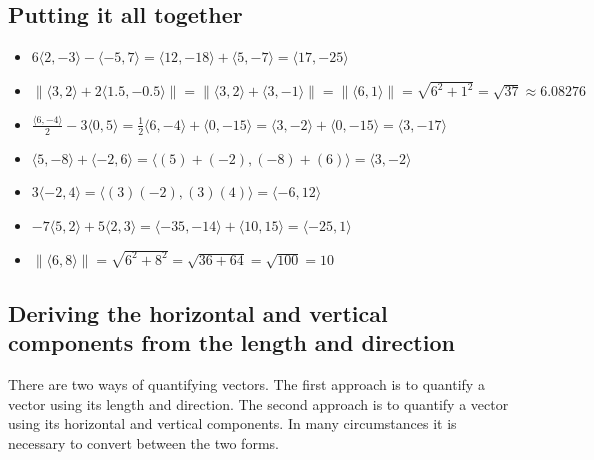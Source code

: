 \documentclass{article}
\begin{document}
\subsection*{Putting it all together}

\begin{itemize}
\item \(6\langle 2, -3 \rangle - \langle -5, 7 \rangle = \langle 12, -18 \rangle + \langle 5, -7 \rangle = \langle 17, -25 \rangle\)
\item \(\|\langle 3, 2 \rangle + 2\langle 1.5, -0.5 \rangle\| = \|\langle 3, 2 \rangle + \langle 3, -1 \rangle\| = \|\langle 6, 1 \rangle\| = \sqrt{6^2 + 1^2} = \sqrt{37} \approx 6.08276\)
\item \(\frac{\langle 6, -4 \rangle}{2} - 3\langle 0, 5 \rangle = \frac{1}{2}\langle 6, -4 \rangle + \langle 0, -15 \rangle = \langle 3, -2 \rangle + \langle 0, -15 \rangle = \langle 3, -17 \rangle\)
\item \(\langle 5, -8 \rangle + \langle -2, 6 \rangle = \langle (5) + (-2) , (-8) + (6) \rangle = \langle 3 , -2 \rangle\)
\item \(3 \langle -2, 4 \rangle = \langle (3)(-2), (3)(4) \rangle = \langle -6, 12 \rangle\)
\item \(-7 \langle 5, 2 \rangle + 5 \langle 2, 3 \rangle = \langle -35, -14 \rangle + \langle 10, 15 \rangle = \langle -25, 1 \rangle\)
\item \(\|\langle 6, 8 \rangle\| = \sqrt{6^2 + 8^2} = \sqrt{36 + 64} = \sqrt{100} = 10\)
\end{itemize}


\subsection*{Deriving the horizontal and vertical components from the length and direction}

There are two ways of quantifying vectors. The first approach is to quantify a vector using its length and direction. The second approach is to quantify a vector using its horizontal and vertical components. In many circumstances it is necessary to convert between the two forms.
\end{document}
